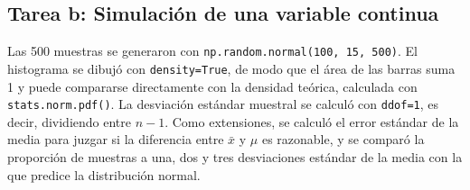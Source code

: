 \documentclass[11pt,letterpaper]{article}
\begin{document}
\subsection{Tarea b: Simulación de una variable continua}

Las 500 muestras se generaron con \texttt{np.random.normal(100, 15, 500)}. El histograma se dibujó con \texttt{density=True}, de modo que el área de las barras suma 1 y puede compararse directamente con la densidad teórica, calculada con \texttt{stats.norm.pdf()}. La desviación estándar muestral se calculó con \texttt{ddof=1}, es decir, dividiendo entre $n - 1$. Como extensiones, se calculó el error estándar de la media para juzgar si la diferencia entre $\bar{x}$ y $\mu$ es razonable, y se comparó la proporción de muestras a una, dos y tres desviaciones estándar de la media con la que predice la distribución normal.
\end{document}
